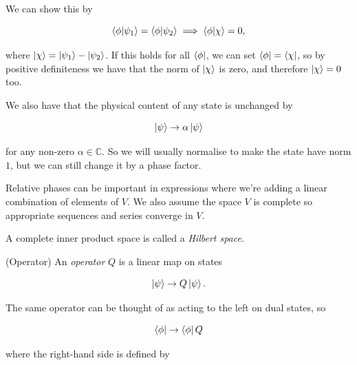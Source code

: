 \documentclass{article}
\begin{document}
We can show this by

\[
    \bra{\phi}\ket{\psi_1}
    =
    \bra{\phi}\ket{\psi_2}
    \implies
    \bra{\phi}\ket{\chi}=0,
\]

where $\ket{\chi}=\ket{\psi_1}-\ket{\psi_2}$. If this holds for all $\bra{\phi}$, we can set $\bra{\phi}=\bra{\chi}$, so by positive definiteness we have that the norm of $\ket{\chi}$ is zero, and therefore $\ket{\chi}=0$ too.

\par

We also have that the physical content of any state is unchanged by

\[
    \ket{\psi} \to \alpha\ket{\psi}
\]

for any non-zero $\alpha \in \mathbb{C}$. So we will usually normalise to make the state have norm $1$, but we can still change it by a phase factor.

\begin{remark}

    Relative phases can be important in expressions where we're adding a linear combination of elements of $V$. We also assume the space $V$ is complete so appropriate sequences and series converge in $V$.

\end{remark}

A complete inner product space is called a \textit{Hilbert space}.

\par

\begin{definition}

    (Operator) An \textit{operator} $Q$ is a linear map on states

    \[
        \ket{\psi} \to Q\ket{\psi}.
    \]

\end{definition}

The same operator can be thought of as acting to the left on dual states, so

\[
    \bra{\phi} \to \bra{\phi}Q
\]

where the right-hand side is defined by
\end{document}
